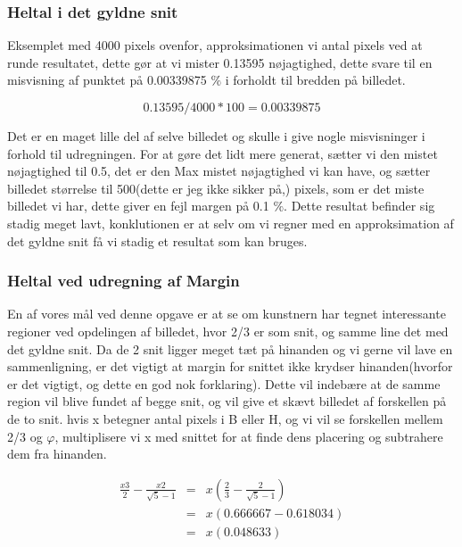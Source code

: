 \subsubsection*{Heltal i det gyldne snit}
Eksemplet med 4000 pixels ovenfor, approksimationen vi antal pixels ved at
runde resultatet, dette gør at vi mister 0.13595 nøjagtighed, dette svare
til en misvisning af punktet på 0.00339875 $\%$ i forholdt til bredden på
billedet. 

\begin{equation}
	0.13595/4000*100 = 0.00339875
\end{equation}

Det er en maget lille del af selve billedet og skulle i give nogle
misvisninger i forhold til udregningen. For at gøre det lidt mere
generat, sætter vi den mistet nøjagtighed til 0.5, det er den Max mistet
nøjagtighed vi kan have, og sætter billedet størrelse til 500(dette er
jeg ikke sikker på,) pixels, som er det miste billedet vi har, dette
giver en fejl margen på 0.1 $\%$. Dette resultat befinder sig stadig
meget lavt, konklutionen er at selv om vi regner med en
approksimation af det gyldne snit få vi stadig et resultat som kan bruges.

\subsubsection{Heltal ved udregning af Margin}
En af vores mål ved denne opgave er at se om kunstnern har tegnet
interessante regioner ved opdelingen af billedet, hvor 2/3 er som snit, og
samme line det med det gyldne snit. Da de 2 snit ligger meget tæt på
hinanden og vi gerne vil lave en sammenligning, er det vigtigt at margin
for snittet ikke krydser hinanden(hvorfor er det vigtigt, og dette en god nok forklaring). Dette vil indebære at de samme
region vil blive fundet af begge snit, og vil give et skævt billedet
af forskellen på de to snit.
hvis x betegner antal pixels i B eller H, og vi vil se
forskellen mellem 2/3 og $\varphi$, multiplisere vi x med snittet for at finde
dens placering og subtrahere dem fra hinanden.

\begin{eqnarray}
	\frac{x3}{2}-\frac{x2}{\sqrt{5}-1} &=& x(\frac{2}{3}-\frac{2}{\sqrt{5}-1}) \\ \nonumber
	&=& x(0.666667-0.618034) \\ \nonumber
	&=& x(0.048633) \\
\end{eqnarray}

